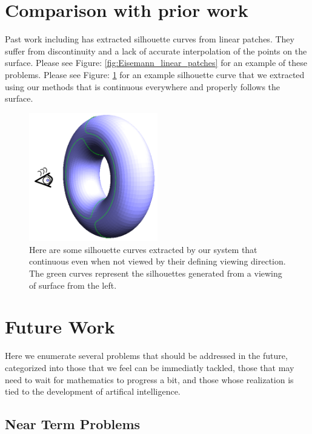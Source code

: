 \documentclass[12pt, letterpaper]{article}
\begin{document}
\section{Comparison with prior work}

Past work including \cite{Eisemann08} has extracted silhouette curves from linear patches. They suffer from discontinuity and a lack of accurate interpolation of the points on the surface.
Please see Figure: \ref{fig:Eisemann_linear_patches} for an example of these problems. Please see Figure: \ref{fig:torus_silhouette_side_view} for an example silhouette curve that we extracted using our methods that is continuous everywhere and properly follows the surface.


\begin{figure}[h]
\centering
\includegraphics[width=0.5\textwidth]{torus_silhouettes_side_view}
\caption{Here are some silhouette curves extracted by our system that continuous even when not viewed by their defining viewing direction.
		The green curves represent the silhouettes generated from a viewing of surface from the left.}
\label{fig:torus_silhouette_side_view}
\end{figure}

\newpage

\section{Future Work}

Here we enumerate several problems that should be addressed in the future,
categorized into those that we feel can be immediatly tackled, those that may need to wait for mathematics to progress a bit,
and those whose realization is tied to the development of artifical intelligence.

	\subsection{Near Term Problems}
\end{document}
